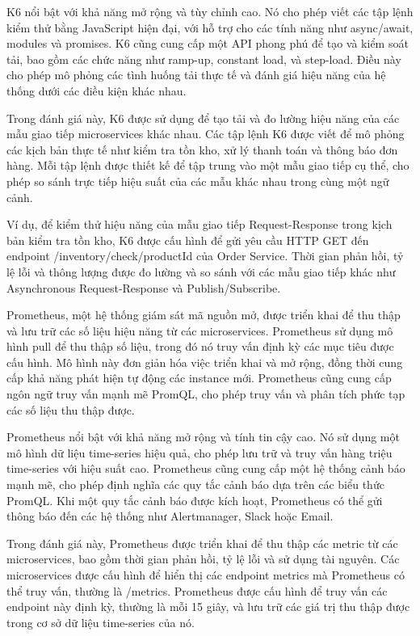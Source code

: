 K6 nổi bật với khả năng mở rộng và tùy chỉnh cao. Nó cho phép viết các tập lệnh kiểm thử bằng JavaScript hiện đại, với hỗ trợ cho các tính năng như async/await, modules và promises. K6 cũng cung cấp một API phong phú để tạo và kiểm soát tải, bao gồm các chức năng như ramp-up, constant load, và step-load. Điều này cho phép mô phỏng các tình huống tải thực tế và đánh giá hiệu năng của hệ thống dưới các điều kiện khác nhau.

Trong đánh giá này, K6 được sử dụng để tạo tải và đo lường hiệu năng của các mẫu giao tiếp microservices khác nhau. Các tập lệnh K6 được viết để mô phỏng các kịch bản thực tế như kiểm tra tồn kho, xử lý thanh toán và thông báo đơn hàng. Mỗi tập lệnh được thiết kế để tập trung vào một mẫu giao tiếp cụ thể, cho phép so sánh trực tiếp hiệu suất của các mẫu khác nhau trong cùng một ngữ cảnh.

Ví dụ, để kiểm thử hiệu năng của mẫu giao tiếp Request-Response trong kịch bản kiểm tra tồn kho, K6 được cấu hình để gửi yêu cầu HTTP GET đến endpoint /inventory/check/{productId} của Order Service. Thời gian phản hồi, tỷ lệ lỗi và thông lượng được đo lường và so sánh với các mẫu giao tiếp khác như Asynchronous Request-Response và Publish/Subscribe.

Prometheus, một hệ thống giám sát mã nguồn mở, được triển khai để thu thập và lưu trữ các số liệu hiệu năng từ các microservices. Prometheus sử dụng mô hình pull để thu thập số liệu, trong đó nó truy vấn định kỳ các mục tiêu được cấu hình. Mô hình này đơn giản hóa việc triển khai và mở rộng, đồng thời cung cấp khả năng phát hiện tự động các instance mới. Prometheus cũng cung cấp ngôn ngữ truy vấn mạnh mẽ PromQL, cho phép truy vấn và phân tích phức tạp các số liệu thu thập được.

Prometheus nổi bật với khả năng mở rộng và tính tin cậy cao. Nó sử dụng một mô hình dữ liệu time-series hiệu quả, cho phép lưu trữ và truy vấn hàng triệu time-series với hiệu suất cao. Prometheus cũng cung cấp một hệ thống cảnh báo mạnh mẽ, cho phép định nghĩa các quy tắc cảnh báo dựa trên các biểu thức PromQL. Khi một quy tắc cảnh báo được kích hoạt, Prometheus có thể gửi thông báo đến các hệ thống như Alertmanager, Slack hoặc Email.

Trong đánh giá này, Prometheus được triển khai để thu thập các metric từ các microservices, bao gồm thời gian phản hồi, tỷ lệ lỗi và sử dụng tài nguyên. Các microservices được cấu hình để hiển thị các endpoint metrics mà Prometheus có thể truy vấn, thường là /metrics. Prometheus được cấu hình để truy vấn các endpoint này định kỳ, thường là mỗi 15 giây, và lưu trữ các giá trị thu thập được trong cơ sở dữ liệu time-series của nó.

